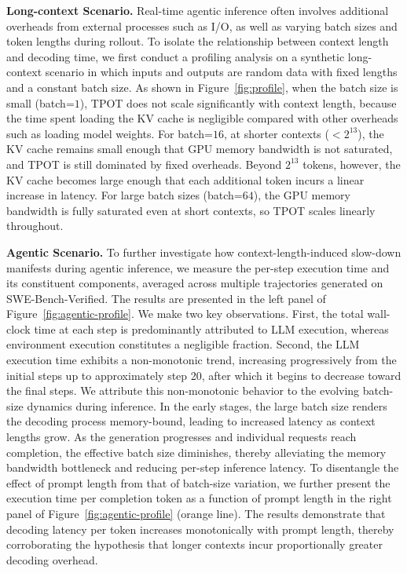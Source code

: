\noindent \textbf{Long-context Scenario.} Real-time agentic inference often involves additional overheads from external processes such as I/O, as well as varying batch sizes and token lengths during rollout. To isolate the relationship between context length and decoding time, we first conduct a profiling analysis on a synthetic long-context scenario in which inputs and outputs are random data with fixed lengths and a constant batch size. As shown in Figure~\ref{fig:profile}, when the batch size is small (batch=$1$), TPOT does not scale significantly with context length, because the time spent loading the KV cache is negligible compared with other overheads such as loading model weights. For batch=$16$, at shorter contexts ($<2^{13}$), the KV cache remains small enough that GPU memory bandwidth is not saturated, and TPOT is still dominated by fixed overheads. Beyond $2^{13}$ tokens, however, the KV cache becomes large enough that each additional token incurs a linear increase in latency. For large batch sizes (batch=$64$), the GPU memory bandwidth is fully saturated even at short contexts, so TPOT scales linearly throughout.

\noindent \textbf{Agentic Scenario.} To further investigate how context-length-induced slow-down manifests during agentic inference, we measure the per-step execution time and its constituent components, averaged across multiple trajectories generated on SWE-Bench-Verified. The results are presented in the left panel of Figure~\ref{fig:agentic-profile}. We make two key observations. First, the total wall-clock time at each step is predominantly attributed to LLM execution, whereas environment execution constitutes a negligible fraction. Second, the LLM execution time exhibits a non-monotonic trend, increasing progressively from the initial steps up to approximately step 20, after which it begins to decrease toward the final steps.
We attribute this non-monotonic behavior to the evolving batch-size dynamics during inference. In the early stages, the large batch size renders the decoding process memory-bound, leading to increased latency as context lengths grow. As the generation progresses and individual requests reach completion, the effective batch size diminishes, thereby alleviating the memory bandwidth bottleneck and reducing per-step inference latency.
To disentangle the effect of prompt length from that of batch-size variation, we further present the execution time per completion token as a function of prompt length in the right panel of Figure~\ref{fig:agentic-profile} (orange line). The results demonstrate that decoding latency per token increases monotonically with prompt length, thereby corroborating the hypothesis that longer contexts incur proportionally greater decoding overhead.